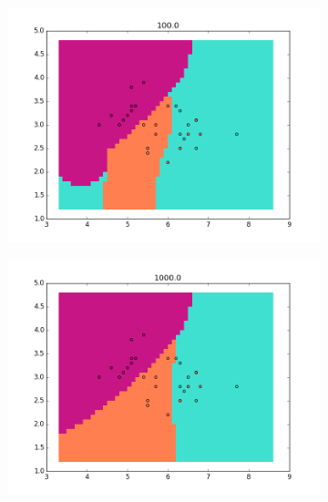 \documentclass{article}
\begin{document}
\begin{center}
\begin{figure}
\centering
        \begin{subfigure}[b]{0.48\textwidth}
                \centering
                \includegraphics[width=\linewidth]{figure_15}
        \end{subfigure}\hfill
        \begin{subfigure}[b]{0.48\textwidth}
                \centering
                \includegraphics[width=\linewidth]{figure_16}
        \end{subfigure}\hfill
        \label{fig:9}
 \end{figure}
\end{center}
\end{document}

